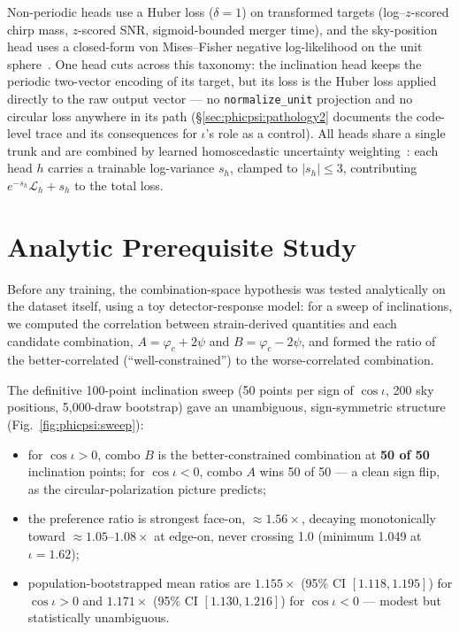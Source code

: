 Non-periodic heads use a Huber loss ($\delta=1$) on transformed targets (log--$z$-scored chirp mass, $z$-scored SNR, sigmoid-bounded merger time), and the sky-position head uses a closed-form von Mises--Fisher negative log-likelihood on the unit sphere~\cite{fisher1953dispersion}.
One head cuts across this taxonomy: the inclination head keeps the periodic two-vector encoding of its target, but its loss is the Huber loss applied directly to the raw output vector --- no \texttt{normalize\_unit} projection and no circular loss anywhere in its path (\S\ref{sec:phicpsi:pathology2} documents the code-level trace and its consequences for $\iota$'s role as a control).
All heads share a single trunk and are combined by learned homoscedastic uncertainty weighting~\cite{kendall2018multi}: each head $h$ carries a trainable log-variance $s_h$, clamped to $|s_h| \le 3$, contributing $e^{-s_h}\mathcal{L}_h + s_h$ to the total loss.


\section{Analytic Prerequisite Study}
\label{sec:phicpsi:prereq}

Before any training, the combination-space hypothesis was tested analytically on the dataset itself, using a toy detector-response model: for a sweep of inclinations, we computed the correlation between strain-derived quantities and each candidate combination, $A = \varphi_c + 2\psi$ and $B = \varphi_c - 2\psi$, and formed the ratio of the better-correlated (``well-constrained'') to the worse-correlated combination.

The definitive 100-point inclination sweep (50 points per sign of $\cos\iota$, 200 sky positions, 5{,}000-draw bootstrap) gave an unambiguous, sign-symmetric structure (Fig.~\ref{fig:phicpsi:sweep}):
\begin{itemize}
\item for $\cos\iota > 0$, combo $B$ is the better-constrained combination at \textbf{50 of 50} inclination points; for $\cos\iota < 0$, combo $A$ wins 50 of 50 --- a clean sign flip, as the circular-polarization picture predicts;
\item the preference ratio is strongest face-on, $\approx 1.56\times$, decaying monotonically toward $\approx 1.05$--$1.08\times$ at edge-on, never crossing 1.0 (minimum 1.049 at $\iota = 1.62$);
\item population-bootstrapped mean ratios are $1.155\times$ (95\% CI $[1.118, 1.195]$) for $\cos\iota > 0$ and $1.171\times$ (95\% CI $[1.130, 1.216]$) for $\cos\iota < 0$ --- modest but statistically unambiguous.
\end{itemize}

